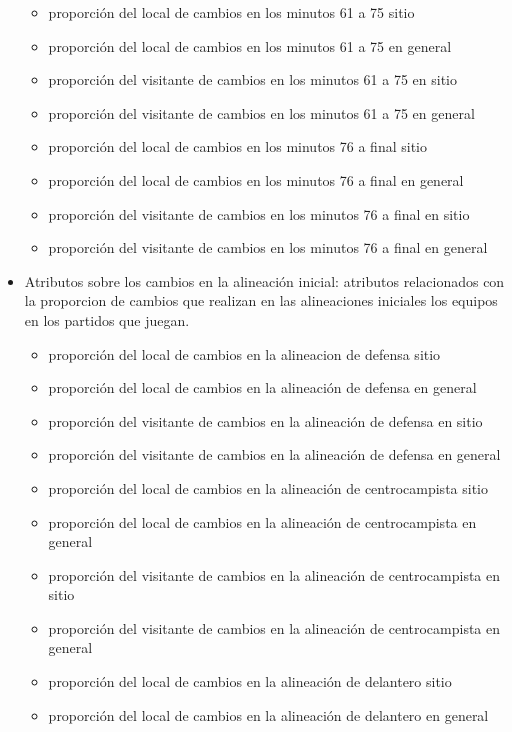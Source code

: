 \begin{itemize}
\begin{itemize}
        \item proporción del local de cambios en los minutos 61 a 75 sitio
        \item proporción del local de cambios en los minutos 61 a 75 en general
        \item proporción del visitante de cambios en los minutos 61 a 75 en sitio
        \item proporción del visitante de cambios en los minutos 61 a 75 en general
        \item proporción del local de cambios en los minutos 76 a final sitio
        \item proporción del local de cambios en los minutos 76 a final en general
        \item proporción del visitante de cambios en los minutos 76 a final en sitio
        \item proporción del visitante de cambios en los minutos 76 a final en general
    \end{itemize}
    \item Atributos sobre los cambios en la alineación inicial: atributos relacionados con la proporcion de cambios que realizan en las alineaciones iniciales los equipos en los partidos que juegan.
    \begin{itemize}
        \item proporción del local de cambios en la alineacion de defensa sitio
        \item proporción del local de cambios en la alineación de defensa en general
        \item proporción del visitante de cambios en la alineación de defensa en sitio
        \item proporción del visitante de cambios en la alineación de defensa en general
        \item proporción del local de cambios en la alineación de centrocampista sitio
        \item proporción del local de cambios en la alineación de centrocampista en general
        \item proporción del visitante de cambios en la alineación de centrocampista en sitio
        \item proporción del visitante de cambios en la alineación de centrocampista en general
        \item proporción del local de cambios en la alineación de delantero sitio
        \item proporción del local de cambios en la alineación de delantero en general

\end{itemize}
\end{itemize}
